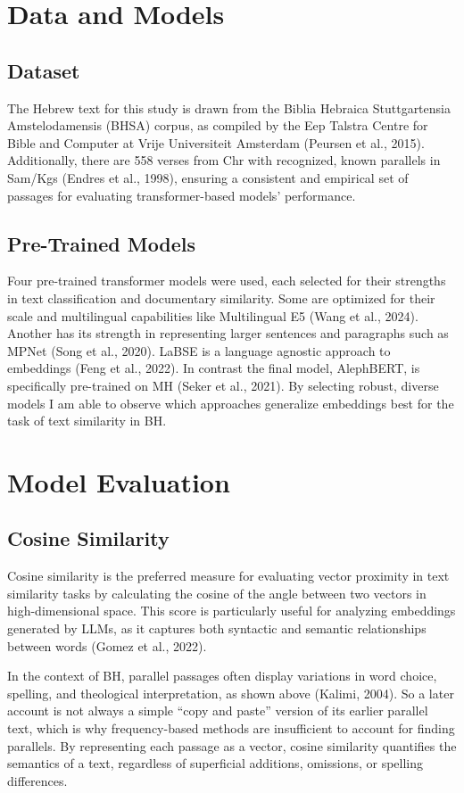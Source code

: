 \documentclass[12pt]{article}
\begin{document}
\section{Data and Models}
\subsection{Dataset}
The Hebrew text for this study is drawn from the Biblia Hebraica Stuttgartensia Amstelodamensis (BHSA) corpus, as compiled by the Eep Talstra Centre for Bible and Computer at Vrije Universiteit Amsterdam (Peursen et al., 2015). Additionally, there are 558 verses from Chr with recognized, known parallels in Sam/Kgs (Endres et al., 1998), ensuring a consistent and empirical set of passages for evaluating transformer-based models’ performance.

\subsection{Pre-Trained Models}
Four pre-trained transformer models were used, each selected for their strengths in text classification and documentary similarity. Some are optimized for their scale and multilingual capabilities like Multilingual E5 (Wang et al., 2024). Another has its strength in representing larger sentences and paragraphs such as MPNet (Song et al., 2020).  LaBSE is a language agnostic approach to embeddings (Feng et al., 2022). In contrast the final model, AlephBERT, is specifically pre-trained on MH (Seker et al., 2021). By selecting robust, diverse models I am able to observe which approaches generalize embeddings best for the task of text similarity in BH.

\section{Model Evaluation}
\subsection{Cosine Similarity}
Cosine similarity is the preferred measure for evaluating vector proximity in text similarity tasks by calculating the cosine of the angle between two vectors in high-dimensional space. This score is particularly useful for analyzing embeddings generated by LLMs, as it captures both syntactic and semantic relationships between words (Gomez et al., 2022).

In the context of BH, parallel passages often display variations in word choice, spelling, and theological interpretation, as shown above (Kalimi, 2004). So a later account is not always a simple “copy and paste” version of its earlier parallel text, which is why frequency-based methods are insufficient to account for finding parallels. By representing each passage as a vector, cosine similarity quantifies the semantics of a text, regardless of superficial additions, omissions, or spelling differences.
\end{document}
